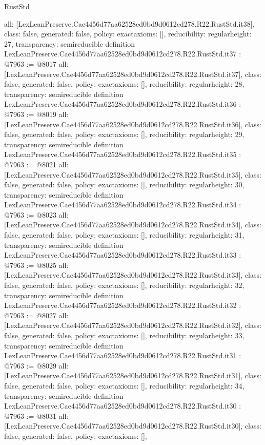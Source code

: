 \begin{lexlean}{RustStd}
\begin{coremodule}
{  all: [LexLeanPreserve.Cae4456d77aa62528ed0bd9d0612cd278.R22.RustStd.it38],
  class: false,
  generated: false,
  policy: exact{axioms: []},
  reducibility: regular{height: 27},
  transparency: semireducible
}
definition LexLeanPreserve.Cae4456d77aa62528ed0bd9d0612cd278.R22.RustStd.it37 : @7963 := @8017 {
  all: [LexLeanPreserve.Cae4456d77aa62528ed0bd9d0612cd278.R22.RustStd.it37],
  class: false,
  generated: false,
  policy: exact{axioms: []},
  reducibility: regular{height: 28},
  transparency: semireducible
}
definition LexLeanPreserve.Cae4456d77aa62528ed0bd9d0612cd278.R22.RustStd.it36 : @7963 := @8019 {
  all: [LexLeanPreserve.Cae4456d77aa62528ed0bd9d0612cd278.R22.RustStd.it36],
  class: false,
  generated: false,
  policy: exact{axioms: []},
  reducibility: regular{height: 29},
  transparency: semireducible
}
definition LexLeanPreserve.Cae4456d77aa62528ed0bd9d0612cd278.R22.RustStd.it35 : @7963 := @8021 {
  all: [LexLeanPreserve.Cae4456d77aa62528ed0bd9d0612cd278.R22.RustStd.it35],
  class: false,
  generated: false,
  policy: exact{axioms: []},
  reducibility: regular{height: 30},
  transparency: semireducible
}
definition LexLeanPreserve.Cae4456d77aa62528ed0bd9d0612cd278.R22.RustStd.it34 : @7963 := @8023 {
  all: [LexLeanPreserve.Cae4456d77aa62528ed0bd9d0612cd278.R22.RustStd.it34],
  class: false,
  generated: false,
  policy: exact{axioms: []},
  reducibility: regular{height: 31},
  transparency: semireducible
}
definition LexLeanPreserve.Cae4456d77aa62528ed0bd9d0612cd278.R22.RustStd.it33 : @7963 := @8025 {
  all: [LexLeanPreserve.Cae4456d77aa62528ed0bd9d0612cd278.R22.RustStd.it33],
  class: false,
  generated: false,
  policy: exact{axioms: []},
  reducibility: regular{height: 32},
  transparency: semireducible
}
definition LexLeanPreserve.Cae4456d77aa62528ed0bd9d0612cd278.R22.RustStd.it32 : @7963 := @8027 {
  all: [LexLeanPreserve.Cae4456d77aa62528ed0bd9d0612cd278.R22.RustStd.it32],
  class: false,
  generated: false,
  policy: exact{axioms: []},
  reducibility: regular{height: 33},
  transparency: semireducible
}
definition LexLeanPreserve.Cae4456d77aa62528ed0bd9d0612cd278.R22.RustStd.it31 : @7963 := @8029 {
  all: [LexLeanPreserve.Cae4456d77aa62528ed0bd9d0612cd278.R22.RustStd.it31],
  class: false,
  generated: false,
  policy: exact{axioms: []},
  reducibility: regular{height: 34},
  transparency: semireducible
}
definition LexLeanPreserve.Cae4456d77aa62528ed0bd9d0612cd278.R22.RustStd.it30 : @7963 := @8031 {
  all: [LexLeanPreserve.Cae4456d77aa62528ed0bd9d0612cd278.R22.RustStd.it30],
  class: false,
  generated: false,
  policy: exact{axioms: []},
}
\end{coremodule}
\end{lexlean}
